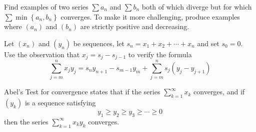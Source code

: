 \begin{solution}
  \enum{
  \item \TODO
  \item \TODO
  \item \TODO
  }
\end{solution}

\begin{exercise}
  Find examples of two series $\sum a_{n}$ and $\sum b_{n}$ both of which diverge but for which $\sum \min \left\{a_{n}, b_{n}\right\}$ converges. To make it more challenging, produce examples where $\left(a_{n}\right)$ and $\left(b_{n}\right)$ are strictly positive and decreasing.
\end{exercise}

\begin{solution}
  \TODO
\end{solution}

\begin{exercise}
  Let $\left(x_{n}\right)$ and $\left(y_{n}\right)$ be sequences, let $s_{n}=x_{1}+x_{2}+\cdots+x_{n}$ and set $s_{0}=0 .$ Use the observation that $x_{j}=s_{j}-s_{j-1}$ to verify the formula
  $$
  \sum_{j=m}^{n} x_{j} y_{j}=s_{n} y_{n+1}-s_{m-1} y_{m}+\sum_{j=m}^{n} s_{j}\left(y_{j}-y_{j+1}\right)
  $$
\end{exercise}

\begin{solution}
  \TODO
\end{solution}

\begin{exercise}
  Abel's Test for convergence states that if the series $\sum_{k=1}^{\infty} x_{k}$ converges, and if $\left(y_{k}\right)$ is a sequence satisfying
  $$
  y_{1} \geq y_{2} \geq y_{3} \geq \cdots \geq 0
  $$
  then the series $\sum_{k=1}^{\infty} x_{k} y_{k}$ converges.
\end{exercise}

\begin{solution}
  \enum{
  \item \TODO
  \item \TODO
  }
\end{solution}


